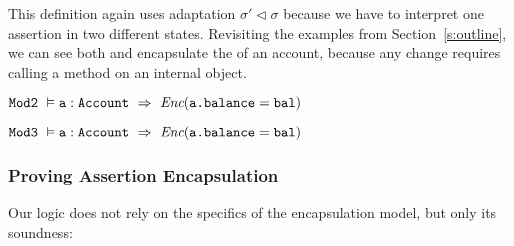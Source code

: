 
\noindent
This definition again uses adaptation 
${\sigma' \triangleleft \sigma}$
because we have to interpret one assertion in two different states.
%
%
Revisiting the examples from Section~\ref{s:outline}, we can see
both \ModB and \ModC encapsulate the  of an
account, because any change requires calling a method on an internal object.
%
\\
\strut \hspace{1cm}
$\ModB\ \vDash \prg{a}:\prg{Account}\ \Rightarrow\ \encaps{\prg{a.balance}=\prg{bal}}$
\\
\strut \hspace{1cm}
$\ModC\ \vDash \prg{a}:\prg{Account}\ \Rightarrow\ \encaps{\prg{a.balance}=\prg{bal}}$


\subsubsection{Proving Assertion Encapsulation}


Our logic does not rely on the specifics of the encapsulation
  model, but only its soundness:

